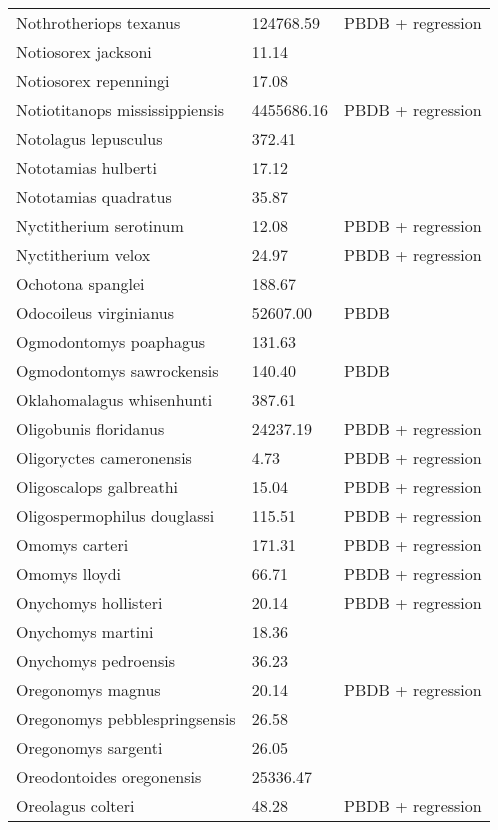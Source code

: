 \documentclass{article}
\begin{document}
\begin{center}
\begin{longtable}{p{} p{} p{} }
  Nothrotheriops texanus & 124768.59 & PBDB + regression \\ 
  Notiosorex jacksoni & 11.14 & \cite{Madden1985} \\ 
  Notiosorex repenningi & 17.08 & \cite{Lillegraven1977} \\ 
  Notiotitanops mississippiensis & 4455686.16 & PBDB + regression \\ 
  Notolagus lepusculus & 372.41 & \cite{Tomiya2013} \\ 
  Nototamias hulberti & 17.12 & \cite{Tomiya2013} \\ 
  Nototamias quadratus & 35.87 & \cite{Tomiya2013} \\ 
  Nyctitherium serotinum & 12.08 & PBDB + regression \\ 
  Nyctitherium velox & 24.97 & PBDB + regression \\ 
  Ochotona spanglei & 188.67 & \cite{Tomiya2013} \\ 
  Odocoileus virginianus & 52607.00 & PBDB \\ 
  Ogmodontomys poaphagus & 131.63 & \cite{Tomiya2013} \\ 
  Ogmodontomys sawrockensis & 140.40 & PBDB \\ 
  Oklahomalagus whisenhunti & 387.61 & \cite{Tomiya2013} \\ 
  Oligobunis floridanus & 24237.19 & PBDB + regression \\ 
  Oligoryctes cameronensis & 4.73 & PBDB + regression \\ 
  Oligoscalops galbreathi & 15.04 & PBDB + regression \\ 
  Oligospermophilus douglassi & 115.51 & PBDB + regression \\ 
  Omomys carteri & 171.31 & PBDB + regression \\ 
  Omomys lloydi & 66.71 & PBDB + regression \\ 
  Onychomys hollisteri & 20.14 & PBDB + regression \\ 
  Onychomys martini & 18.36 & \cite{Tomiya2013} \\ 
  Onychomys pedroensis & 36.23 & \cite{Tomiya2013} \\ 
  Oregonomys magnus & 20.14 & PBDB + regression \\ 
  Oregonomys pebblespringsensis & 26.58 & \cite{Tomiya2013} \\ 
  Oregonomys sargenti & 26.05 & \cite{Tomiya2013} \\ 
  Oreodontoides oregonensis & 25336.47 & \cite{Tomiya2013} \\ 
  Oreolagus colteri & 48.28 & PBDB + regression \\ 

\end{longtable}
\end{center}
\end{document}
